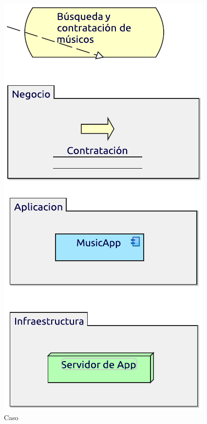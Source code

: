 \begin{figure}[h!]
	\centering
	\includegraphics[width=0.5\linewidth]{Desarrollo/ArquitecturaEmpresarial/Tecnologia/imgs/capas.pdf}
	\caption{Caso}
\end{figure}

\newpage